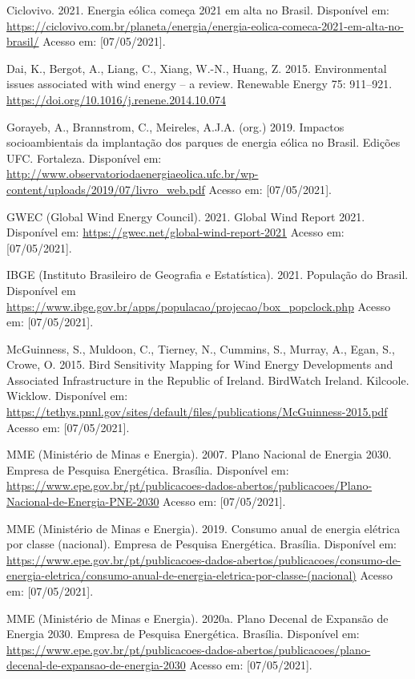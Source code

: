 \documentclass[
  oneside]{scrbook}
\begin{document}
Ciclovivo. 2021. Energia eólica começa 2021 em alta no Brasil. Disponível em: \url{https://ciclovivo.com.br/planeta/energia/energia-eolica-comeca-2021-em-alta-no-brasil/} Acesso em: {[}07/05/2021{]}.

Dai, K., Bergot, A., Liang, C., Xiang, W.-N., Huang, Z. 2015. Environmental issues associated with wind energy -- a review. Renewable Energy 75: 911--921. \url{https://doi.org/10.1016/j.renene.2014.10.074}

Gorayeb, A., Brannstrom, C., Meireles, A.J.A. (org.) 2019. Impactos socioambientais da implantação dos parques de energia eólica no Brasil. Edições UFC. Fortaleza. Disponível em: \url{http://www.observatoriodaenergiaeolica.ufc.br/wp-content/uploads/2019/07/livro_web.pdf} Acesso em: {[}07/05/2021{]}.

GWEC (Global Wind Energy Council). 2021. Global Wind Report 2021. Disponível em: \url{https://gwec.net/global-wind-report-2021} Acesso em: {[}07/05/2021{]}.

IBGE (Instituto Brasileiro de Geografia e Estatística). 2021. População do Brasil. Disponível em \url{https://www.ibge.gov.br/apps/populacao/projecao/box_popclock.php} Acesso em: {[}07/05/2021{]}.

McGuinness, S., Muldoon, C., Tierney, N., Cummins, S., Murray, A., Egan, S., Crowe, O. 2015. Bird Sensitivity Mapping for Wind Energy Developments and Associated Infrastructure in the Republic of Ireland. BirdWatch Ireland. Kilcoole. Wicklow. Disponível em: \url{https://tethys.pnnl.gov/sites/default/files/publications/McGuinness-2015.pdf} Acesso em: {[}07/05/2021{]}.

MME (Ministério de Minas e Energia). 2007. Plano Nacional de Energia 2030. Empresa de Pesquisa Energética. Brasília. Disponível em: \url{https://www.epe.gov.br/pt/publicacoes-dados-abertos/publicacoes/Plano-Nacional-de-Energia-PNE-2030} Acesso em: {[}07/05/2021{]}.

MME (Ministério de Minas e Energia). 2019. Consumo anual de energia elétrica por classe (nacional). Empresa de Pesquisa Energética. Brasília. Disponível em: \url{https://www.epe.gov.br/pt/publicacoes-dados-abertos/publicacoes/consumo-de-energia-eletrica/consumo-anual-de-energia-eletrica-por-classe-(nacional)} Acesso em: {[}07/05/2021{]}.

MME (Ministério de Minas e Energia). 2020a. Plano Decenal de Expansão de Energia 2030. Empresa de Pesquisa Energética. Brasília. Disponível em: \url{https://www.epe.gov.br/pt/publicacoes-dados-abertos/publicacoes/plano-decenal-de-expansao-de-energia-2030} Acesso em: {[}07/05/2021{]}.
\end{document}
